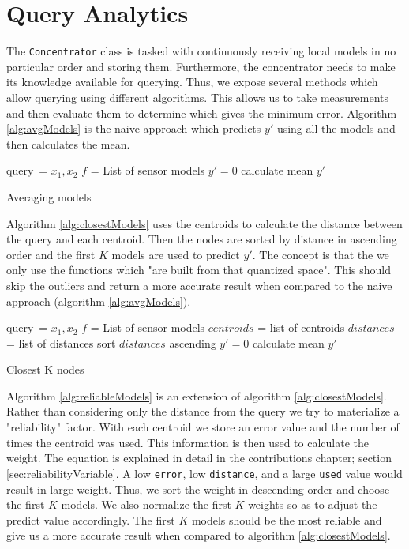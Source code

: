\documentclass{mproj}
\begin{document}
\section{Query Analytics}
The \texttt{Concentrator} class is tasked with continuously receiving local models in no particular order and storing them. Furthermore, the concentrator needs to make its knowledge available for querying. Thus, we expose several methods which allow querying using different algorithms. This allows us to take measurements and then evaluate them to determine which gives the minimum error. Algorithm \ref{alg:avgModels} is the naive approach which predicts $y'$ using all the models and then calculates the mean.

\begin{algorithm}[H]
 query\ = $x_1,x_2$\; 
 $f$ = List of sensor models\;
 $y'=0$\;
 calculate mean $y'$
 \caption{Averaging models}
 \label{alg:avgModels}
\end{algorithm}

Algorithm \ref{alg:closestModels} uses the centroids to calculate the distance between the query and each centroid. Then the nodes are sorted by distance in ascending order and the first $K$ models are used to predict $y'$. The concept is that the we only use the functions which "are built from that quantized space". This should skip the outliers and return a more accurate result when compared to the naive approach (algorithm \ref{alg:avgModels}).

\begin{algorithm}[H]
 query\ = $x_1,x_2$\;
 $f$ = List of sensor models\;
 $centroids$ = list of centroids\;
 $distances$ = list of distances\;
 sort $distances$ ascending\;
 $y'=0$\;
 calculate mean $y'$\;
 \caption{Closest K nodes}
 \label{alg:closestModels}
\end{algorithm}

Algorithm \ref{alg:reliableModels} is an extension of algorithm \ref{alg:closestModels}. Rather than considering only the distance from the query we try to materialize a "reliability" factor. With each centroid we store an error value and the number of times the centroid was used. This information is then used to calculate the weight. The equation is explained in detail in the contributions chapter; section \ref{sec:reliabilityVariable}. A low \texttt{error}, low \texttt{distance}, and a large \texttt{used} value would  result in large weight. Thus, we sort the weight in descending order and choose the first $K$ models. We also normalize the first $K$ weights so as to adjust the predict value accordingly. The first $K$ models should be the most reliable and give us a more accurate result when compared to algorithm \ref{alg:closestModels}.
\end{document}

